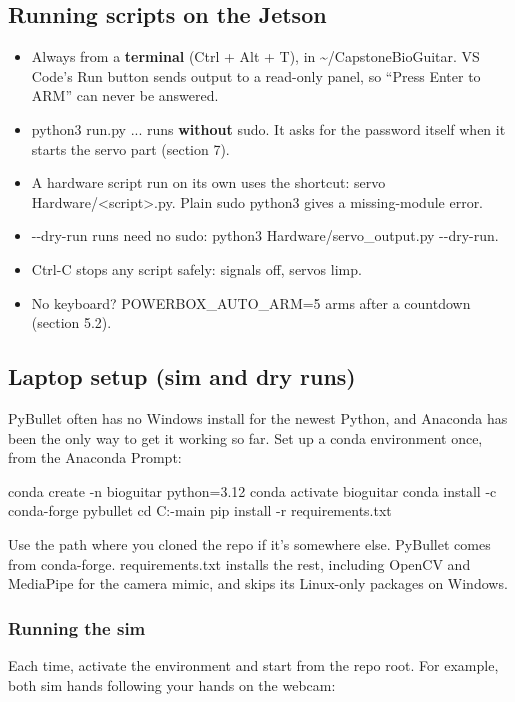 \documentclass[11pt,letterpaper]{article}
\newcommand{\code}[1]{\textcolor{codeblue}{\ttfamily\smaller\relax #1}}
\begin{document}
\subsection{Running scripts on the Jetson}
\begin{itemize}
  \item Always from a \textbf{terminal} (Ctrl + Alt + T), in \code{\textasciitilde{}/\allowbreak{}CapstoneBioGuitar}. VS Code's Run button sends output to a read-only panel, so ``Press Enter to ARM'' can never be answered.
  \item \code{python3 run.py ...} runs \textbf{without} sudo. It asks for the password itself when it starts the servo part (section 7).
  \item A hardware script run on its own uses the shortcut: \code{servo Hardware/\allowbreak{}<script>.py}. Plain \code{sudo python3} gives a missing-module error.
  \item \code{-{}-{}dry-{}\allowbreak{}run} runs need no sudo: \code{python3 Hardware/\allowbreak{}servo\_\allowbreak{}output.py -{}-{}dry-{}\allowbreak{}run}.
  \item Ctrl-C stops any script safely: signals off, servos limp.
  \item No keyboard? \code{POWERBOX\_\allowbreak{}AUTO\_\allowbreak{}ARM=\allowbreak{}5} arms after a countdown (section 5.2).
\end{itemize}


\subsection{Laptop setup (sim and dry runs)}
PyBullet often has no Windows install for the newest Python, and Anaconda has been the only way to get it working so far. Set up a conda environment once, from the Anaconda Prompt:

\begin{codeblock}
conda create -n bioguitar python=3.12
conda activate bioguitar
conda install -c conda-forge pybullet
cd C:\Users\JMAMA\Documents\Capstone\CapstoneBioGuitar-main
pip install -r requirements.txt
\end{codeblock}
Use the path where you cloned the repo if it's somewhere else. PyBullet comes from conda-forge. \code{requirements.txt} installs the rest, including OpenCV and MediaPipe for the camera mimic, and skips its Linux-only packages on Windows.

\subsubsection*{Running the sim}
Each time, activate the environment and start from the repo root. For example, both sim hands following your hands on the webcam:
\end{document}
